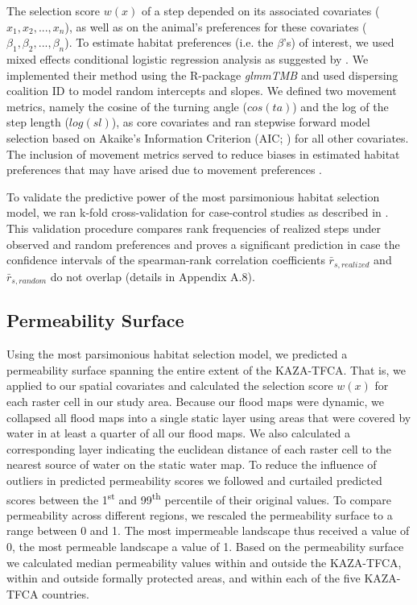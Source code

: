 \documentclass[abstract=on,10pt,a4paper,bibliography=totocnumbered]{article}
\begin{document}
\noindent The selection score \(w(x)\) of a step depended on its associated
covariates (\(x_1, x_2, ..., x_n\)), as well as on the animal's preferences for
these covariates (\(\beta_1, \beta_2, ..., \beta_n\)). To estimate habitat
preferences (i.e. the \(\beta\)'s) of interest, we used mixed effects
conditional logistic regression analysis as suggested by \cite{Muff.2020}. We
implemented their method using the R-package \textit{glmmTMB}
\citep{Mollie.2017} and used dispersing coalition ID to model random intercepts
and slopes. We defined two movement metrics, namely the cosine of the turning
angle (\(cos(ta)\)) and the log of the step length (\(log(sl)\)), as core
covariates and ran stepwise forward model selection based on Akaike's
Information Criterion (AIC; \citealp{Burnham.2002}) for all other covariates.
The inclusion of movement metrics served to reduce biases in estimated habitat
preferences that may have arised due to movement preferences \citep{Avgar.2016}.

To validate the predictive power of the most parsimonious habitat selection
model, we ran k-fold cross-validation for case-control studies as described in
\cite{Fortin.2009}. This validation procedure compares rank frequencies of
realized steps under observed and random preferences and proves a significant
prediction in case the confidence intervals of the spearman-rank correlation
coefficients \(\bar{r}_{s, realized}\) and \(\bar{r}_{s, random}\) do not
overlap (details in Appendix A.8).

\subsection{Permeability Surface}
Using the most parsimonious habitat selection model, we predicted a permeability
surface spanning the entire extent of the KAZA-TFCA. That is, we applied
 to our spatial covariates and calculated the selection score \(w(x)\)
for each raster cell in our study area. Because our flood maps were dynamic, we
collapsed all flood maps into a single static layer using areas that were
covered by water in at least a quarter of all our flood maps. We also calculated
a corresponding layer indicating the euclidean distance of each raster cell to
the nearest source of water on the static water map. To reduce the influence of
outliers in predicted permeability scores we followed \cite{Squires.2013} and
curtailed predicted scores between the 1\textsuperscript{st} and
99\textsuperscript{th} percentile of their original values. To compare
permeability across different regions, we rescaled the permeability surface to a
range between 0 and 1. The most impermeable landscape thus received a value of
0, the most permeable landscape a value of 1. Based on the permeability surface
we calculated median permeability values within and outside the KAZA-TFCA,
within and outside formally protected areas, and within each of the five
KAZA-TFCA countries.
\end{document}
